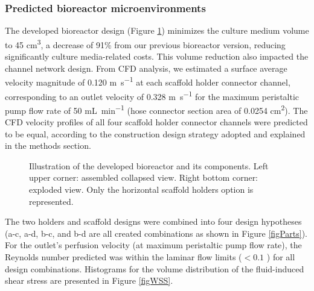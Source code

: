 \subsubsection{Predicted bioreactor microenvironments}
The developed bioreactor design (Figure \ref{figExploded}) minimizes the culture medium volume to 45 \unit{\cubic\centi\meter}, a decrease of 91\% from our previous bioreactor version, reducing significantly culture media-related costs. This volume reduction also impacted the channel network design. From \acs{CFD} analysis, we estimated a surface average velocity magnitude of 0.120 \unit{\meter\per\second} at each scaffold holder connector channel, corresponding to an outlet velocity of 0.328 \unit{\meter\per\second} for the maximum peristaltic pump flow rate of 50 \unit{\milli\liter\per\minute} (hose connector section area of 0.0254 \unit{\square\centi\meter}). The \acs{CFD} velocity profiles of all four scaffold holder connector channels were predicted to be equal, according to the construction design strategy adopted and explained in the methods section.


\begin{figure}
\caption{Illustration of the developed bioreactor and its components. Left upper corner: assembled collapsed view. Right bottom corner: exploded view. Only the horizontal scaffold holders option is represented.}
\label{figExploded}
\end{figure}


The two holders and scaffold designs were combined into four design hypotheses (a-c, a-d, b-c, and b-d are all created combinations as shown in Figure \ref{figParts}). For the outlet's perfusion velocity (at maximum peristaltic pump flow rate), the Reynolds number predicted was within the laminar flow limits ($<0.1$ \cite{LaNasa2014-hl}) for all design combinations. Histograms for the volume distribution of the fluid-induced shear stress are presented in Figure \ref{figWSS}.

